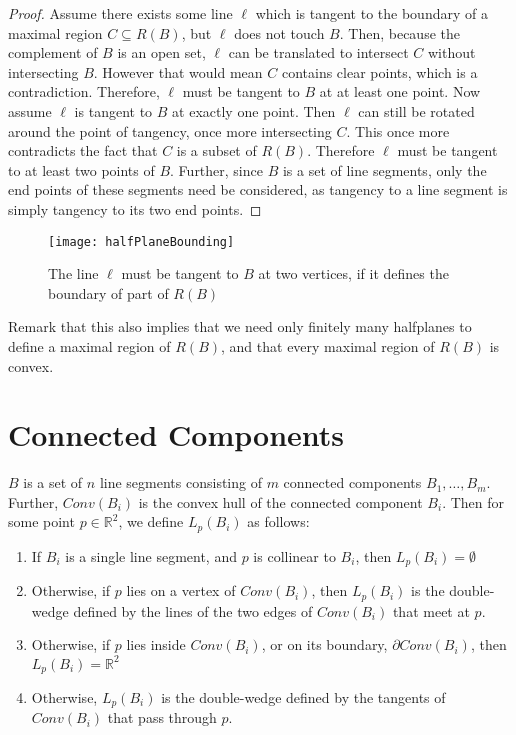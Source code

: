 \documentclass{cccg12}
\begin{document}
\begin{proof}

Assume there exists some line $\ell$ which is tangent to the boundary of a maximal region $C \subseteq R(B)$, but $\ell$ does not touch $B$. Then, because the complement of $B$ is an open set, $\ell$ can be translated to intersect $C$ without intersecting $B$. However that would mean $C$ contains clear points, which is a contradiction. Therefore, $\ell$ must be tangent to $B$ at at least one point. Now assume $\ell$ is tangent to $B$ at exactly one point. Then $\ell$ can still be rotated around the point of tangency, once more intersecting $C$. This once more contradicts the fact that $C$ is a subset of $R(B)$. Therefore $\ell$ must be tangent to at least two points of $B$. Further, since $B$ is a set of line segments, only the end points of these segments need be considered, as tangency to a line segment is simply tangency to its two end points.\end{proof}

\begin{figure}[ht]
  \centering
  \texttt{[image: halfPlaneBounding]}
  \caption{The line $\ell$ must be tangent to $B$ at two vertices, if it defines the boundary of part of $R(B)$}
  \label{fig:halfPlaneBounding}
\end{figure}

Remark that this also implies that we need only finitely many halfplanes to define a maximal region of $R(B)$, and that every maximal region of $R(B)$ is convex.



\section{Connected Components}

$B$ is a set of $n$ line segments consisting of $m$ connected components $B_1, \dots, B_m$. Further, $Conv(B_i)$ is the convex hull of the connected component $B_i$. Then for some point $p \in \mathds{R}^2$, we define $L_p(B_i)$ as follows:

\begin{enumerate}
\item If $B_i$ is a single line segment, and $p$ is collinear to $B_i$, then $L_p(B_i) = \emptyset$ 
\item Otherwise, if $p$ lies on a vertex of $Conv(B_i)$, then $L_p(B_i)$ is the double-wedge defined by the lines of the two edges of $Conv(B_i)$ that meet at $p$. 
\item Otherwise, if $p$ lies inside $Conv(B_i)$, or on its boundary, $\partial Conv(B_i)$, then $L_p(B_i) = \mathds{R}^2$
\item Otherwise, $L_p(B_i)$ is the double-wedge defined by the tangents of $Conv(B_i)$ that pass through $p$. 
\end{enumerate}
\end{document}
